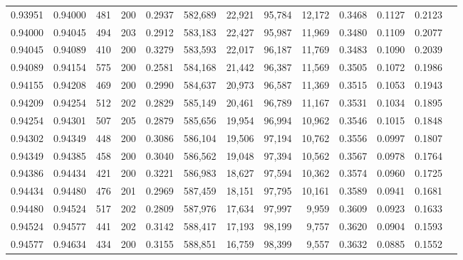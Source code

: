 \begin{tabular}{rrrrrrrrrrrrr}
0.93951 & 0.94000 &   481 & 200 &                                     0.2937 & 582,689 &  22,921 &  95,784 &  12,172 & 0.3468 & 0.1127 & 0.2123 \\
0.94000 & 0.94045 &   494 & 203 &                                     0.2912 & 583,183 &  22,427 &  95,987 &  11,969 & 0.3480 & 0.1109 & 0.2077 \\
0.94045 & 0.94089 &   410 & 200 &                                     0.3279 & 583,593 &  22,017 &  96,187 &  11,769 & 0.3483 & 0.1090 & 0.2039 \\
0.94089 & 0.94154 &   575 & 200 &                                     0.2581 & 584,168 &  21,442 &  96,387 &  11,569 & 0.3505 & 0.1072 & 0.1986 \\
0.94155 & 0.94208 &   469 & 200 &                                     0.2990 & 584,637 &  20,973 &  96,587 &  11,369 & 0.3515 & 0.1053 & 0.1943 \\
0.94209 & 0.94254 &   512 & 202 &                                     0.2829 & 585,149 &  20,461 &  96,789 &  11,167 & 0.3531 & 0.1034 & 0.1895 \\
0.94254 & 0.94301 &   507 & 205 &                                     0.2879 & 585,656 &  19,954 &  96,994 &  10,962 & 0.3546 & 0.1015 & 0.1848 \\
0.94302 & 0.94349 &   448 & 200 &                                     0.3086 & 586,104 &  19,506 &  97,194 &  10,762 & 0.3556 & 0.0997 & 0.1807 \\
0.94349 & 0.94385 &   458 & 200 &                                     0.3040 & 586,562 &  19,048 &  97,394 &  10,562 & 0.3567 & 0.0978 & 0.1764 \\
0.94386 & 0.94434 &   421 & 200 &                                     0.3221 & 586,983 &  18,627 &  97,594 &  10,362 & 0.3574 & 0.0960 & 0.1725 \\
0.94434 & 0.94480 &   476 & 201 &                                     0.2969 & 587,459 &  18,151 &  97,795 &  10,161 & 0.3589 & 0.0941 & 0.1681 \\
0.94480 & 0.94524 &   517 & 202 &                                     0.2809 & 587,976 &  17,634 &  97,997 &   9,959 & 0.3609 & 0.0923 & 0.1633 \\
0.94524 & 0.94577 &   441 & 202 &                                     0.3142 & 588,417 &  17,193 &  98,199 &   9,757 & 0.3620 & 0.0904 & 0.1593 \\
0.94577 & 0.94634 &   434 & 200 &                                     0.3155 & 588,851 &  16,759 &  98,399 &   9,557 & 0.3632 & 0.0885 & 0.1552 \\

\end{tabular}

